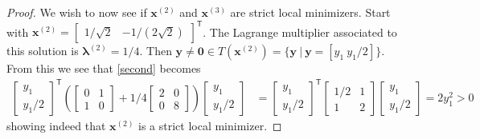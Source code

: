 \documentclass[12pt]{article}
\theoremstyle{definition}
\newcommand{\vc}[1]{\boldsymbol{#1}}
\newcommand{\tran}{\mathsf{T}}
\begin{document}
\begin{proof}
  We wish to now see if $\vc{x}^{(2)}$ and $\vc{x}^{(3)}$ are strict local minimizers. Start with $\vc{x}^{(2)} = \begin{bmatrix}1/\sqrt{2} & -1/(2\sqrt{2})\end{bmatrix}^\tran$.
  The Lagrange multiplier associated to this solution is $\vc{\lambda}^{(2)} = 1/4$. Then $\vc{y} \neq \vc{0} \in T(\vc{x}^{(2)}) = \{\vc{y}\ |\  \vc{y} = [y_1 \ y_1/2]\}$. From this we see that \eqref{second} becomes
  \begin{align*}
    \begin{bmatrix}y_1 \\ y_1/2\end{bmatrix}^\tran\left(\begin{bmatrix}0 & 1 \\ 1 & 0\end{bmatrix} + 1/4\begin{bmatrix}2 & 0 \\ 0 &8\end{bmatrix}\right)\begin{bmatrix}y_1 \\ y_1/2\end{bmatrix} &=
    \begin{bmatrix}y_1 \\ y_1/2\end{bmatrix}^\tran\begin{bmatrix}1/2 & 1 \\ 1 & 2\end{bmatrix}\begin{bmatrix}y_1 \\ y_1/2\end{bmatrix} = 2y_1^2 > 0
  \end{align*}
  showing indeed that $\vc{x}^{(2)}$ is a strict local minimizer.


\end{proof}
\end{document}
